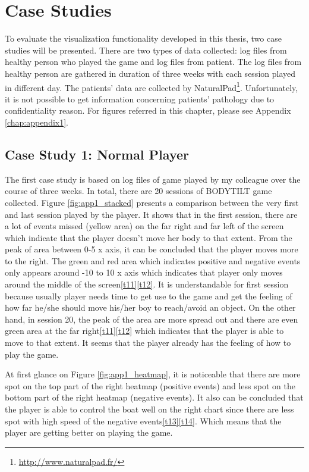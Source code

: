 \chapter{Case Studies}
To evaluate the visualization functionality developed in this thesis, two case studies will be presented. There are two types of data collected: log files from healthy person who played the game and log files from patient. The log files from healthy person are gathered in duration of three weeks with each session played in different day. The patients' data are collected by NaturalPad\footnote{\url{http://www.naturalpad.fr/}}. Unfortunately, it is not possible to get information concerning patients' pathology due to confidentiality reason. For figures referred in this chapter, please see Appendix \ref{chap:appendix1}.

\section{Case Study 1: Normal Player}
The first case study is based on log files of game played by my colleague over the course of three weeks. In total, there are 20 sessions of BODYTILT game collected. Figure \ref{fig:app1_stacked} presents a comparison between the very first and last session played by the player. It shows that in the first session, there are a lot of events missed (yellow area) on the far right and far left of the screen which indicate that the player doesn't move her body to that extent. From the peak of area between 0-5 x axis, it can be concluded that the player moves more to the right. The green and red area which indicates positive and negative events only appears around -10 to 10 x axis which indicates that player only moves around the middle of the screen\ref{t11}\ref{t12}. It is understandable for first session because usually player needs time to get use to the game and get the feeling of how far he/she should move his/her boy to reach/avoid an object. On the other hand, in session 20, the peak of the area are more spread out and there are even green area at the far right\ref{t11}\ref{t12} which indicates that the player is able to move to that extent. It seems that the player already has the feeling of how to play the game.

At first glance on Figure \ref{fig:app1_heatmap}, it is noticeable that there are more spot on the top part of the right heatmap (positive events) and less spot on the bottom part of the right heatmap (negative events). It also can be concluded that the player is able to control the boat well on the right chart since there are less spot with high speed of the negative events\ref{t13}\ref{t14}. Which means that the player are getting better on playing the game. 

